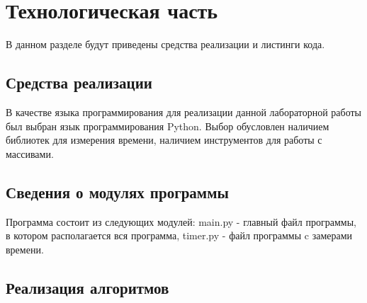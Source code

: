 \chapter{Технологическая часть}

В данном разделе будут приведены средства реализации и листинги кода.


\section{Средства реализации}

В качестве языка программирования для реализации данной лабораторной работы был выбран язык программирования Python. Выбор обусловлен наличием библиотек для измерения времени, наличием инструментов для работы с массивами.


\section{Сведения о модулях программы}
Программа состоит из следующих модулей:
main.py - главный файл программы, в котором располагается вся программа,
timer.py - файл программы c замерами времени.


\section{Реализация алгоритмов}

